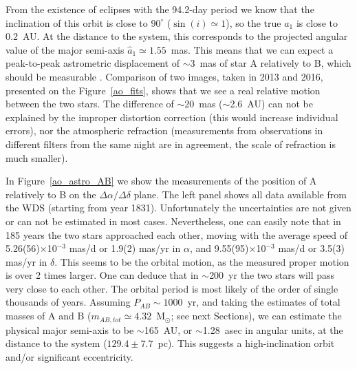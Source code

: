 \documentclass{aa}
\begin{document}

From the existence of eclipses with the 94.2-day period we know that the
inclination of this orbit is close to $90^\circ$ ($\sin(i)\simeq1$), so the true $a_1$ 
is close to 0.2~AU. At the distance to the system, this corresponds 
to the projected angular value of the major semi-axis $\hat{a}_1\simeq1.55$~mas. 
This means that we can expect a peak-to-peak astrometric displacement of $\sim$3~mas 
of star A relatively to B, which should be measurable \citep[][and the errors in 
Table~\ref{tab_ao_obslog}]{neu07,rol08,hel09b}. Comparison of two images, taken in 
2013 and 2016, presented on the Figure~\ref{ao_fits}, shows that we see a real 
relative motion between the two stars. The difference of $\sim$20~mas ($\sim$2.6~AU) can not 
be explained by the improper distortion correction (this would increase individual errors), 
nor the atmospheric refraction (measurements from observations in different filters 
from the same night are in agreement, the scale of refraction is much smaller).

In Figure~\ref{ao_astro_AB} we show the measurements of the position of A relatively 
to B on the $\Delta\alpha/\Delta\delta$ plane. The left panel shows all data available
from the WDS (starting from year 1831). Unfortunately the uncertainties are not given or can 
not be estimated in most cases. Nevertheless, one can easily note that in 185 years the two stars 
approached each other, moving with the average speed of 5.26(56)$\times$10$^{-3}$ mas/d or 1.9(2) mas/yr 
in $\alpha$, and 9.55(95)$\times$10$^{-3}$ mas/d or 3.5(3) mas/yr in $\delta$. This seems to be 
the orbital motion, as the measured proper motion is over 2 times larger. One can deduce that in 
$\sim$200~yr the two stars will pass very close to each other. The orbital period is most likely 
of the order of single thousands of years. Assuming $P_{AB}\sim1000$~yr, and taking the estimates 
of total masses of A and B ($m_{AB,tot}\simeq4.32$~M$_\odot$; see next Sections), we can 
estimate the physical major semi-axis to be $\sim$165~AU, or $\sim$1.28~asec in angular units, 
at the distance to the system ($129.4\pm7.7$~pc). This suggests a high-inclination orbit 
and/or significant eccentricity. 
\end{document}
